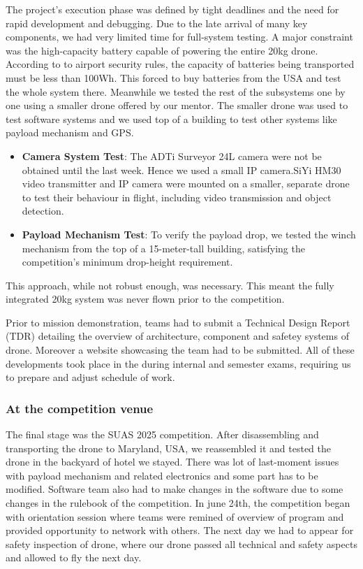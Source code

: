 The project's execution phase was defined by tight deadlines and the need for rapid development and debugging. Due to the late arrival of many key components, we had very limited time for full-system testing. A major constraint was the high-capacity battery capable of powering the entire 20kg drone. According to to airport security rules, the capacity of batteries being transported must be less than 100Wh. This forced to buy batteries from the USA and test the whole system there. Meanwhile we tested the rest of the subsystems one by one using a smaller drone offered by our mentor. The smaller drone was used to test software systems and we used top of a building to test other systems like payload mechanism and GPS.
\begin{itemize}
	\item \textbf{Camera System Test}: The ADTi Surveyor 24L camera were not be obtained until the last week. Hence we used a small IP camera.SiYi HM30 video transmitter and IP camera were mounted on a smaller, separate drone to test their behaviour in flight, including video transmission and object detection.
	\item \textbf {Payload Mechanism Test}: To verify the payload drop, we tested the winch mechanism from the top of a 15-meter-tall building, satisfying the competition's minimum drop-height requirement.
\end{itemize}

This approach, while not robust enough, was necessary. This meant the fully integrated 20kg system was never flown prior to the competition.

Prior to mission demonstration, teams had to submit a Technical Design Report (TDR) detailing the overview of architecture, component and safetey systems of drone. Moreover a website showcasing the team had to be submitted. All of these developments took place in the during internal and semester exams, requiring us to prepare and adjust schedule of work.

\subsubsection{At the competition venue}
The final stage was the SUAS 2025 competition. After disassembling and transporting the drone to Maryland, USA, we reassembled it and tested the drone in the backyard of hotel we stayed. There was lot of last-moment issues with payload mechanism and related electronics and some part has to be modified. Software team also had to make changes in the software due to some changes in the rulebook of the competition. In june 24th, the competition began with orientation session where teams were remined of overview of program and provided opportunity to network with others. The next day we had to appear for safety inspection of drone, where our drone passed all technical and safety aspects and allowed to fly the next day.

